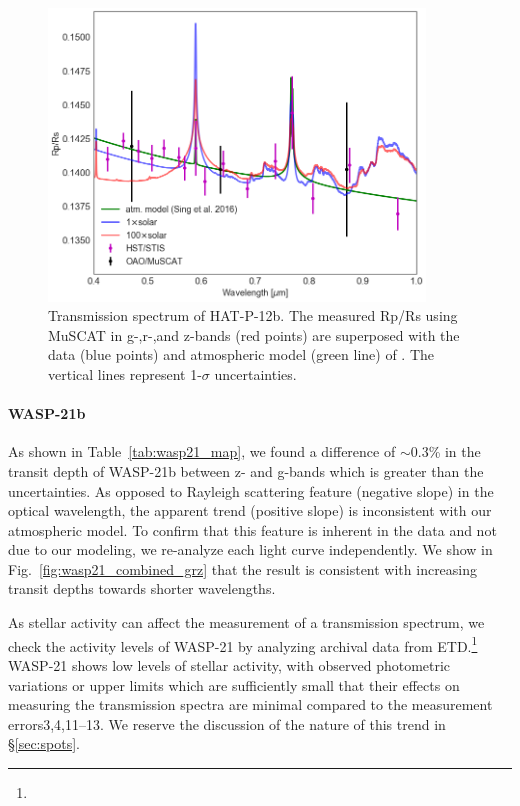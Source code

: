 \begin{figure}
\centering
	\includegraphics[width=10cm]{hatp12/atm_model_full.png}
    \caption{Transmission spectrum of HAT-P-12b. The measured Rp/Rs using MuSCAT in g-,r-,and z-bands (red points) are superposed with the data (blue points) and atmospheric model (green line) of \cite{Sing2016}. The vertical lines represent 1-$\sigma$ uncertainties.
    }\label{fig:hatp12_sing}
\end{figure}

\paragraph{WASP-21b}
As shown in Table~\ref{tab:wasp21_map}, we found a %
difference of $\sim$0.3\%  in the transit depth of WASP-21b %
between z- and g-bands which is greater than the uncertainties. 
As opposed to Rayleigh scattering feature (negative slope) in the optical wavelength, the apparent trend (positive slope) is inconsistent with our atmospheric model. 
To confirm that this feature is inherent in the data and not due to our modeling, we re-analyze each light curve independently. We show in Fig.~\ref{fig:wasp21_combined_grz} that the result is consistent with increasing transit depths towards shorter wavelengths. 

As stellar activity can affect the measurement of a transmission spectrum, we %
check the activity levels of WASP-21 by analyzing archival data from ETD.\footnote{} 
WASP-21 shows low levels of stellar activity, with observed photometric variations or upper limits which are sufficiently small that their effects on measuring the transmission spectra are minimal compared to the measurement errors3,4,11–13. %
We reserve the discussion of the nature of this trend in \S \ref{sec:spots}.

